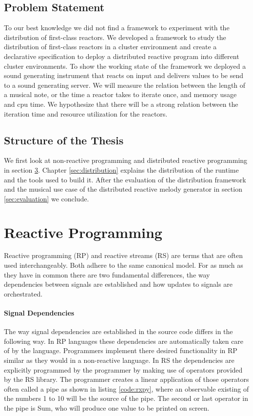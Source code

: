 \documentclass[a4paper]{book}
\begin{document}
\section{Problem Statement}
To our best knowledge we did not find a framework to experiment with the distribution of first-class reactors. We developed a framework to study the distribution of first-class reactors in a cluster environment and create a declarative specification to deploy a distributed reactive program into different cluster environments. To show the working state of the framework we deployed a sound generating instrument that reacts on input and delivers values to be send to a sound generating server. We will measure the relation between the length of a musical note, or the time a reactor takes to iterate once, and memory usage and cpu time. We hypothesize that there will be a strong relation between the iteration time and resource utilization for the reactors.  

\section{Structure of the Thesis}
We first look at non-reactive programming and distributed reactive programming in section \ref{sec:rp}. Chapter \ref{sec:distribution} explains the distribution of the runtime and the tools used to build it. After the evaluation of the distribution framework and the musical use case of the distributed reactive melody generator in section \ref{sec:evaluation} we conclude. 


\chapter{Reactive Programming} \label{sec:rp}

Reactive programming (RP) and reactive streams (RS) are terms that are often used interchangeably. Both adhere to the same canonical model.  For as much as they have in common there are two fundamental differences, the way dependencies between signals are established and how updates to signals are orchestrated.

\subsubsection{Signal Dependencies}
The way signal dependencies are established in the source code differs in the following way. In RP languages these dependencies are automatically taken care of by the language. Programmers implement there desired functionality in RP similar as they would in a non-reactive language. In RS the dependencies are explicitly programmed by the programmer by making use of operators provided by the RS library. The programmer creates a linear application of those operators often called a pipe as shown in listing \ref{code:rxpy}, where an observable existing of the numbers 1 to 10 will be the source of the pipe. The second or last operator in the pipe is Sum, who will produce one value to be printed on screen.
\end{document}
